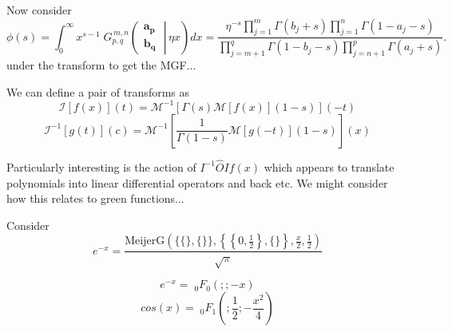 \documentclass[journal=jcisd8,manuscript=article,layout=onecolumn,pdftex,floatfix,amsmath,amssymb,10pt]{achemso}
\begin{document}
Now consider 
$$
\phi(s) = \int_0^{\infty} x^{s - 1} \; G_{p,q}^{\,m,n} \!\left( \left. \begin{matrix} \mathbf{a_p} \\ \mathbf{b_q} \end{matrix} \; \right| \, \eta x \right) dx =
\frac{\eta^{-s} \prod_{j = 1}^{m} \Gamma (b_j + s) \prod_{j = 1}^{n} \Gamma (1 - a_j - s)} {\prod_{j = m + 1}^{q} \Gamma (1 - b_j - s) \prod_{j = n + 1}^{p} \Gamma (a_j + s)}.
$$
under the transform to get the MGF...


We can define a pair of transforms as 
$$
\mathcal{I}[f(x)](t) = \mathcal{M}^{-1}[\Gamma(s)\mathcal{M}[f(x)](1-s)](-t)
$$
$$
\mathcal{I}^{-1}[g(t)](c) = \mathcal{M}^{-1}[\frac{1}{\Gamma(1-s)}\mathcal{M}[g(-t)](1-s)](x)
$$

Particularly interesting is the action of $I^{-1} \hat{O} I f(x)$ which appears to translate polynomials into linear differential operators and back etc. We might consider how this relates to green functions... 






Consider 
$$
e^{-x} =  \frac{\text{MeijerG}\left(\{\{\},\{\}\},\left\{\left\{0,\frac{1}{2}\right\},\{\}\right\},\frac{x}{2},\frac{1}{2}\right)}{\sqrt{\pi }}
$$


$$
e^{-x} = \;_0F_0(;;-x)
$$
$$
cos(x) = \;_0F_1\left(;\frac{1}{2};-\frac{x^2}{4}\right)
$$
\end{document}
